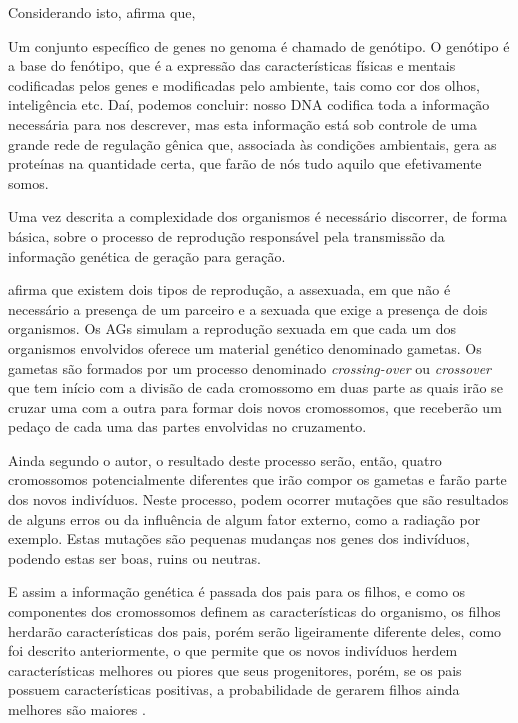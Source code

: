 \par Considerando isto,  afirma que,

\begin{citacao}
	Um conjunto específico de genes no genoma é chamado de genótipo. O
	genótipo é a base do fenótipo, que é a expressão das características
	físicas e mentais codificadas pelos genes e modificadas pelo
	ambiente, tais como cor dos olhos, inteligência etc. Daí, podemos concluir: nosso
	DNA codifica toda a informação necessária para nos descrever, mas esta
	informação está sob controle de uma grande rede de regulação gênica
	que, associada às condições ambientais, gera as proteínas na quantidade
	certa, que farão de nós tudo aquilo que efetivamente
	somos.
\end{citacao}  

\par Uma vez descrita a complexidade dos organismos é necessário discorrer,
de forma básica, sobre o processo de reprodução responsável pela
transmissão da informação genética de geração para geração.

\par {} afirma que existem dois tipos de reprodução,
a assexuada, em que não é necessário a presença de um parceiro e a sexuada que exige a
presença de dois organismos.
Os AGs simulam a reprodução sexuada em que cada um dos organismos envolvidos
oferece um material genético denominado gametas. Os gametas são formados por um
processo denominado \textit{crossing-over} ou \textit{crossover} que tem início com a divisão de cada cromossomo em duas parte as quais 
irão se cruzar uma com a outra para formar dois novos cromossomos, que
receberão um pedaço de cada uma das partes envolvidas no cruzamento.

\par Ainda segundo o autor, o resultado deste processo serão, então, quatro
cromossomos potencialmente diferentes que irão compor os gametas e farão parte
dos novos indivíduos. Neste processo, podem ocorrer mutações que são resultados
de alguns erros ou da influência de algum fator externo, como a radiação por exemplo. Estas mutações são
pequenas mudanças nos genes dos indivíduos, podendo estas ser boas, ruins ou neutras.


\par E assim a informação genética é passada dos pais para os filhos, e como os
componentes dos cromossomos definem as características do organismo, os filhos
herdarão características dos pais, porém serão ligeiramente diferente deles,
como foi descrito anteriormente, o que permite que os novos indivíduos herdem
características melhores ou piores que seus progenitores, porém, se os pais
possuem características positivas, a probabilidade de gerarem filhos ainda
melhores são maiores \cite{livro_ags_ricardo_linden}.

